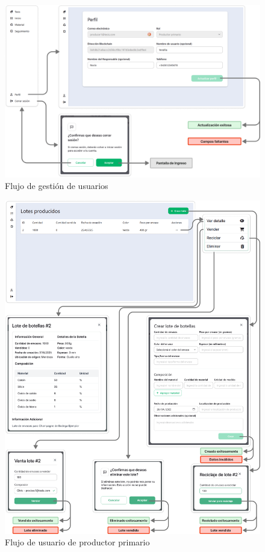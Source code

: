 \begin{figure}[!htb]
	\centering
	\includegraphics[width=\linewidth]{Figures/flow-user-management.png}
	\caption{Flujo de gestión de usuarios}
  \label{fig:flow-user-management}
\end{figure}

\begin{figure}[!htb]
	\centering
	\includegraphics[width=\linewidth]{Figures/flow-primary-producer.png}
	\caption{Flujo de usuario de productor primario}
  \label{fig:flow-primary-producer}
\end{figure}


